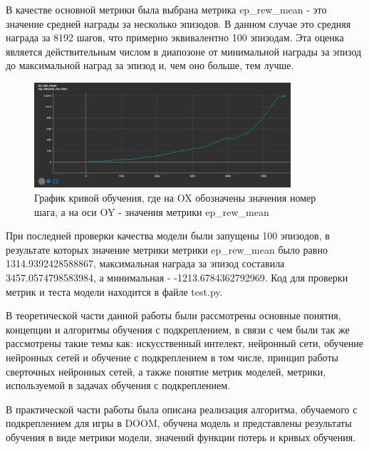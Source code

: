 \documentclass[bachelor, och, coursework]{shiza}
\begin{document}
В качестве основной метрики была выбрана метрика ep_rew_mean - это значение средней награды за несколько эпизодов. В данном случае это средняя награда за 8192 шагов, что примерно
эквивалентно 100 эпизодам. Эта оценка является действительным числом в диапозоне от минимальной награды за эпизод до максимальной наград за эпизод и, чем оно больше, тем лучше.

\begin{figure}[H]
    \centering
    \includegraphics[width=0.85\textwidth]{pic/13}
    \caption{График кривой обучения, где на OX обозначены значения номер шага, а на оси OY - значения метрики ep_rew_mean}
    \label{fig:img1}
\end{figure}

При последней проверки качества модели были запущены 100 эпизодов, в результате которых значение метрики метрики ep_rew_mean было равно 1314.9392428588867, максимальная награда
за эпизод составила 3457.0574798583984, а минимальная - -1213.6784362792969. Код для проверки метрик и теста модели находится в файле test.py.
\newpage
\conclusion %

В теоретической части данной работы были рассмотрены основные понятия, концепции и алгоритмы обучения с подкреплением, в связи с чем были так же рассмотрены такие темы как:
искусственный интелект, нейронный сети, обучение нейронных сетей и обучение с подкреплением в том числе, принцип работы сверточных нейронных сетей, а также понятие метрик моделей,
метрики, используемой в задачах обучения с подкреплением.

В практической части работы была описана реализация алгоритма, обучаемого с подкреплением для игры в DOOM, обучена модель и представлены результаты обучения в виде метрики модели,
значений функции потерь и кривых обучения.
\end{document}
